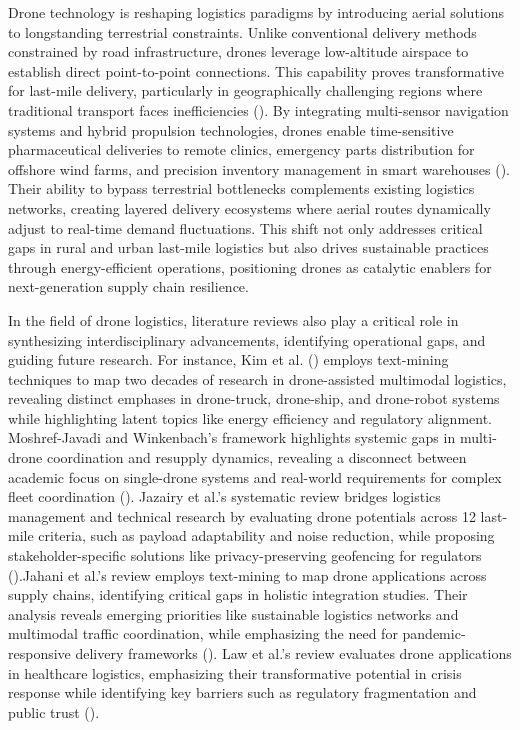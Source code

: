 \documentclass{article}
\begin{document}
Drone technology is reshaping logistics paradigms by introducing aerial solutions to longstanding terrestrial constraints. Unlike conventional delivery methods constrained by road infrastructure, drones leverage low-altitude airspace to establish direct point-to-point connections. This capability proves transformative for last-mile delivery, particularly in geographically challenging regions where traditional transport faces inefficiencies (\cite{WOS:001404731600001}).  By integrating multi-sensor navigation systems and hybrid propulsion technologies, drones enable time-sensitive pharmaceutical deliveries to remote clinics, emergency parts distribution for offshore wind farms, and precision inventory management in smart warehouses (\cite{WOS:001262605900001}). Their ability to bypass terrestrial bottlenecks complements existing logistics networks, creating layered delivery ecosystems where aerial routes dynamically adjust to real-time demand fluctuations. This shift not only addresses critical gaps in rural and urban last-mile logistics but also drives sustainable practices through energy-efficient operations, positioning drones as catalytic enablers for next-generation supply chain resilience.

In the field of drone logistics, literature reviews also play a critical role in synthesizing interdisciplinary advancements, identifying operational gaps, and guiding future research. For instance, Kim et al. (\cite{WOS:001323645000001}) employs text-mining techniques to map two decades of research in drone-assisted multimodal logistics, revealing distinct emphases in drone-truck, drone-ship, and drone-robot systems while highlighting latent topics like energy efficiency and regulatory alignment. Moshref-Javadi and Winkenbach’s framework highlights systemic gaps in multi-drone coordination and resupply dynamics, revealing a disconnect between academic focus on single-drone systems and real-world requirements for complex fleet coordination  (\cite{WOS:000693999200007}). Jazairy et al.’s systematic review bridges logistics management and technical research by evaluating drone potentials across 12 last-mile criteria, such as payload adaptability and noise reduction, while proposing stakeholder-specific solutions like privacy-preserving geofencing for regulators (\cite{WOS:001160422800001}).Jahani et al.’s  review employs text-mining to map drone applications across supply chains, identifying critical gaps in holistic integration studies. Their analysis reveals emerging priorities like sustainable logistics networks and multimodal traffic coordination, while emphasizing the need for pandemic-responsive delivery frameworks (\cite{WOS:001262605900001}).  Law et al.’s review evaluates drone applications in healthcare logistics, emphasizing their transformative potential in crisis response while identifying key barriers such as regulatory fragmentation and public trust  (\cite{WOS:000999662500001}).  
\end{document}
